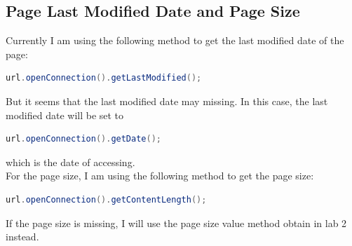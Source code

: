 \documentclass{article}
\begin{document}
        \subsection*{Page Last Modified Date and Page Size}
            Currently I am using the following method to get the last modified date of the page:
            \begin{lstlisting}[language=Java]
                url.openConnection().getLastModified();
            \end{lstlisting}
            But it seems that the last modified date may missing. In this case, the last modified date will be set to 
            \begin{lstlisting}[language=Java]
                url.openConnection().getDate();
            \end{lstlisting}
            which is the date of accessing. \\[0.4em]
            For the page size, I am using the following method to get the page size:
            \begin{lstlisting}[language=Java]
                url.openConnection().getContentLength();
            \end{lstlisting}
            If the page size is missing, I will use the page size value method obtain in lab 2 instead.
        
            
\end{document}
